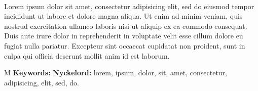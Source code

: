 \thesisImprintTitle\\
\thesisImprintSubtitle\\
\thesisAuthor\\
\thesisDepartment\\
\thesisUniversity\setlength{\parskip}{0.5cm}

\thispagestyle{plain}			%
\section*{\abstractname}
Lorem ipsum dolor sit amet, consectetur adipisicing elit, sed do eiusmod tempor incididunt ut labore et dolore magna aliqua. Ut enim ad minim veniam, quis nostrud exercitation ullamco laboris nisi ut aliquip ex ea commodo consequat. Duis aute irure dolor in reprehenderit in voluptate velit esse cillum dolore eu fugiat nulla pariatur. Excepteur sint occaecat cupidatat non proident, sunt in culpa qui officia deserunt mollit anim id est laborum.

\vfill
\if\thesisType M
    \textbf{Keywords:}
\else
    \textbf{Nyckelord:}
\fi
lorem, ipsum, dolor, sit, amet, consectetur, adipisicing, elit, sed, do.

\if{}
\newpage				%
\thispagestyle{empty}
\mbox{}
\fi
